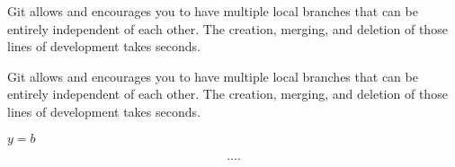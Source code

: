 Git allows and encourages you to have multiple local branches that can be entirely independent of each other. The creation, merging, and deletion of those lines of development takes seconds.


Git allows and encourages you to have multiple local branches that can be entirely independent of each other. The creation, merging, and deletion of those lines of development takes seconds.

$y=b$

\begin{equation}....\end{equation}

